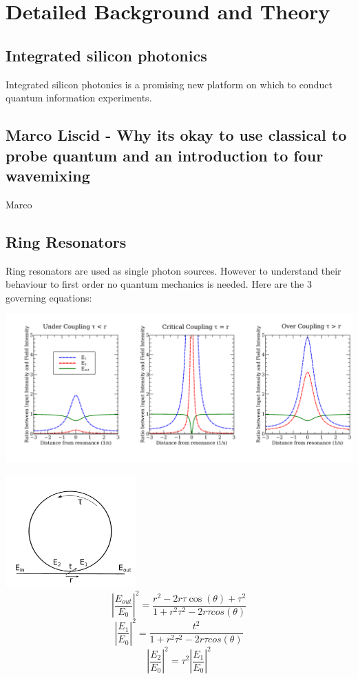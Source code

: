 \newpage
\section{Detailed Background and Theory}
\subsection{Integrated silicon photonics}
Integrated silicon photonics is a promising new platform on which to conduct quantum information experiments. 
\subsection{Marco Liscid - Why its okay to use classical to probe quantum and an introduction to four wavemixing}
Marco \cite{helt_how_2012}
\subsection{Ring Resonators}
Ring resonators are used as single photon sources. However to understand their behaviour to first order no quantum mechanics is needed. Here are the 3 governing equations:

\begingroup
    \centering  
    \includegraphics[width=18cm]{img/theory/coupling.pdf}
     \vspace{3pt} \label{crossCompare}
\endgroup

\begingroup
\centering
    \includegraphics[width=5cm]{img/theory/ring.pdf}
\endgroup
\begin{equation}
\left |\frac{E_{out}}{E_{0}}\right|^2=\frac{r^2-2r\tau\cos(\theta)+\tau^2}{1+r^2\tau^2-2r\tau cos(\theta)}
\end{equation}
\begin{equation}
\left|\frac{E_{1}}{E_{0}}\right |^2=\frac{t^2}{1+r^2\tau^2-2r\tau cos(\theta)}
\end{equation}
\begin{equation}
\left |\frac{E_{2}}{E_{0}}\right |^2=\tau^2\left|\frac{E_{1}}{E_{0}}\right |^2
\end{equation}

